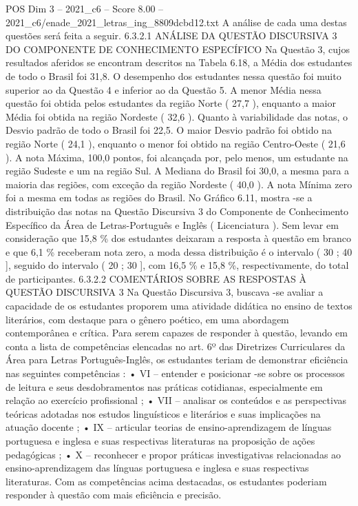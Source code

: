 \begin{textsample}{POS Dim 3 – 2021\_c6 – Score 8.00 – 2021\_c6/enade\_2021\_letras\_ing\_8809dcbd12.txt}
A análise de cada uma destas questões será feita a seguir. 6.3.2.1 ANÁLISE DA QUESTÃO DISCURSIVA 3 DO COMPONENTE DE CONHECIMENTO ESPECÍFICO Na Questão 3, cujos resultados aferidos se encontram descritos na Tabela 6.18, a Média dos estudantes de todo o Brasil foi 31,8.
O desempenho dos estudantes nessa questão foi muito superior ao da Questão 4 e inferior ao da Questão 5.
A menor Média nessa questão foi obtida pelos estudantes da região Norte ( 27,7 ), enquanto a maior Média foi obtida na região Nordeste ( 32,6 ).
Quanto à variabilidade das notas, o Desvio padrão de todo o Brasil foi 22,5.
O maior Desvio padrão foi obtido na região Norte ( 24,1 ), enquanto o menor foi obtido na região Centro-Oeste ( 21,6 ).
A nota Máxima, 100,0 pontos, foi alcançada por, pelo menos, um estudante na região Sudeste e um na região Sul.
A Mediana do Brasil foi 30,0, a mesma para a maioria das regiões, com exceção da região Nordeste ( 40,0 ).
A nota Mínima zero foi a mesma em todas as regiões do Brasil.
No Gráfico 6.11, mostra -se a distribuição das notas na Questão Discursiva 3 do Componente de Conhecimento Específico da Área de Letras-Português e Inglês ( Licenciatura ).
Sem levar em consideração que 15,8 \% dos estudantes deixaram a resposta à questão em branco e que 6,1 \% receberam nota zero, a moda dessa distribuição é o intervalo ( 30 ; 40 ], seguido do intervalo ( 20 ; 30 ], com 16,5 \% e 15,8 \%, respectivamente, do total de participantes. 6.3.2.2 COMENTÁRIOS SOBRE AS RESPOSTAS À QUESTÃO DISCURSIVA 3 Na Questão Discursiva 3, buscava -se avaliar a capacidade de os estudantes proporem uma atividade didática no ensino de textos literários, com destaque para o gênero poético, em uma abordagem contemporânea e crítica.
Para serem capazes de responder à questão, levando em conta a lista de competências elencadas no art. 6º das Diretrizes Curriculares da Área para Letras Português-Inglês, os estudantes teriam de demonstrar eficiência nas seguintes competências : • VI – entender e posicionar -se sobre os processos de leitura e seus desdobramentos nas práticas cotidianas, especialmente em relação ao exercício profissional ; • VII – analisar os conteúdos e as perspectivas teóricas adotadas nos estudos linguísticos e literários e suas implicações na atuação docente ; • IX – articular teorias de ensino-aprendizagem de línguas portuguesa e inglesa e suas respectivas literaturas na proposição de ações pedagógicas ; • X – reconhecer e propor práticas investigativas relacionadas ao ensino-aprendizagem das línguas portuguesa e inglesa e suas respectivas literaturas.
Com as competências acima destacadas, os estudantes poderiam responder à questão com mais eficiência e precisão.

\end{textsample}
